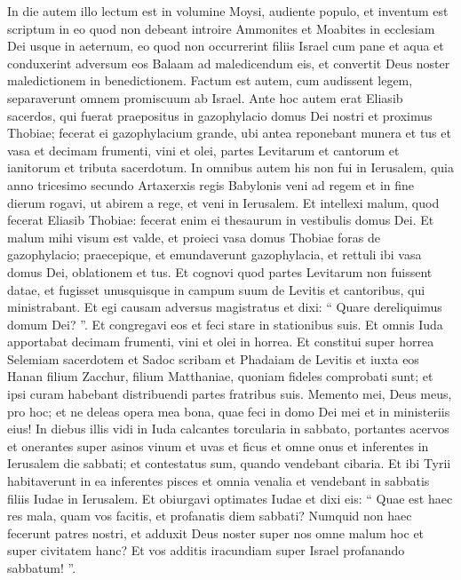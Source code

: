 \begin{biblechapter}
\begin{biblechapter}
\begin{biblechapter}
\begin{biblechapter}
\begin{biblechapter}
\begin{biblechapter}
\begin{biblechapter}
\begin{biblechapter}
\begin{biblechapter}
\begin{biblechapter}
\begin{biblechapter}
\begin{biblechapter}
\begin{biblechapter}
\verse In die autem illo lectum est in volumine Moysi, audiente populo, et inventum est scriptum in eo quod non debeant introire Ammonites et Moabites in ecclesiam Dei usque in aeternum, 
\verse eo quod non occurrerint filiis Israel cum pane et aqua et conduxerint adversum eos Balaam ad maledicendum eis, et convertit Deus noster maledictionem in benedictionem. 
\verse Factum est autem, cum audissent legem, separaverunt omnem promiscuum ab Israel.
 \verse Ante hoc autem erat Eliasib sacerdos, qui fuerat praepositus in gazophylacio domus Dei nostri et proximus Thobiae; 
\verse fecerat ei gazophylacium grande, ubi antea reponebant munera et tus et vasa et decimam frumenti, vini et olei, partes Levitarum et cantorum et ianitorum et tributa sacerdotum.
 \verse In omnibus autem his non fui in Ierusalem, quia anno tricesimo secundo Artaxerxis regis Babylonis veni ad regem et in fine dierum rogavi, ut abirem a rege, 
\verse et veni in Ierusalem. Et intellexi malum, quod fecerat Eliasib Thobiae: fecerat enim ei thesaurum in vestibulis domus Dei. 
\verse Et malum mihi visum est valde, et proieci vasa domus Thobiae foras de gazophylacio; 
\verse praecepique, et emundaverunt gazophylacia, et rettuli ibi vasa domus Dei, oblationem et tus.
 \verse Et cognovi quod partes Levitarum non fuissent datae, et fugisset unusquisque in campum suum de Levitis et cantoribus, qui ministrabant. 
\verse Et egi causam adversus magistratus et dixi: “ Quare dereliquimus domum Dei? ”. Et congregavi eos et feci stare in stationibus suis. 
\verse Et omnis Iuda apportabat decimam frumenti, vini et olei in horrea. 
\verse Et constitui super horrea Selemiam sacerdotem et Sadoc scribam et Phadaiam de Levitis et iuxta eos Hanan filium Zacchur, filium Matthaniae, quoniam fideles comprobati sunt; et ipsi curam habebant distribuendi partes fratribus suis. 
\verse Memento mei, Deus meus, pro hoc; et ne deleas opera mea bona, quae feci in domo Dei mei et in ministeriis eius!
 \verse In diebus illis vidi in Iuda calcantes torcularia in sabbato, portantes acervos et onerantes super asinos vinum et uvas et ficus et omne onus et inferentes in Ierusalem die sabbati; et contestatus sum, quando vendebant cibaria.
 \verse Et ibi Tyrii habitaverunt in ea inferentes pisces et omnia venalia et vendebant in sabbatis filiis Iudae in Ierusalem. 
\verse Et obiurgavi optimates Iudae et dixi eis: “ Quae est haec res mala, quam vos facitis, et profanatis diem sabbati? 
\verse Numquid non haec fecerunt patres nostri, et adduxit Deus noster super nos omne malum hoc et super civitatem hanc? Et vos additis iracundiam super Israel profanando sabbatum! ”.

\end{biblechapter}
\end{biblechapter}
\end{biblechapter}
\end{biblechapter}
\end{biblechapter}
\end{biblechapter}
\end{biblechapter}
\end{biblechapter}
\end{biblechapter}
\end{biblechapter}
\end{biblechapter}
\end{biblechapter}
\end{biblechapter}
